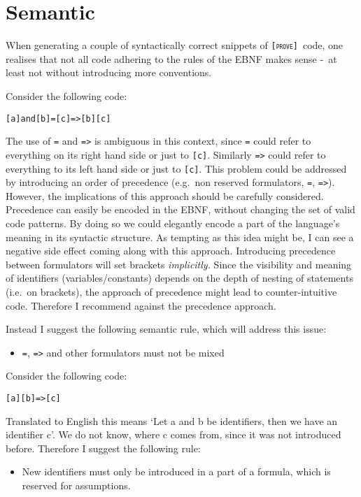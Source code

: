 \documentclass[british]{article}
\newcommand\prv{bc}
\newcommand\m[1]{\texttt{#1}}
\newcommand\name{\texttt{\textsc{[prove]}}}
\begin{document}
\section{Semantic}

When generating a couple of syntactically correct snippets of \name\
code, one realises that not all code adhering to the rules of the
EBNF makes sense -\ at least not without introducing more conventions.

\medskip{}

Consider the following code:

\begin{verbatim}
[a]and[b]=[c]=>[b][c]
\end{verbatim}

The use of \m{=} and \m{=>} is ambiguous in this context, since
\m{=} could refer to everything on its right hand side or just to
\m{[c]}. Similarly \m{=>} could refer to everything to its left
hand side or just to \m{[c]}. This problem could be addressed by
introducing an order of precedence (e.g.\ non reserved formulators,
\m{=}, \m{=>}). However, the implications of this approach should
be carefully considered. Precedence can easily be encoded in the EBNF,
without changing the set of valid code patterns. By doing so we could
elegantly encode a part of the language's meaning in its syntactic
structure. As tempting as this idea might be, I can see a negative
side effect coming along with this approach. Introducing precedence
between formulators will set brackets \textit{implicitly. }Since the
visibility and meaning of identifiers (variables/constants) depends
on the depth of nesting of statements (i.e.\ on brackets), the approach
of precedence might lead to counter-intuitive code. Therefore I recommend
against the precedence approach.

Instead I suggest the following semantic rule, which will address
this issue:
\begin{itemize}
\item \m{=}, \m{=>} and other formulators must not be mixed
\end{itemize}
\medskip{}

Consider the following code:

\begin{verbatim}
[a][b]=>[c]
\end{verbatim}

Translated to English this means `Let a and b be identifiers, then
we have an identifier c'. We do not know, where c comes from, since
it was not introduced before. Therefore I suggest the following rule:
\begin{itemize}
\item New identifiers must only be introduced in a part of a formula, which
is reserved for assumptions.
\end{itemize}
\medskip{}
\end{document}
